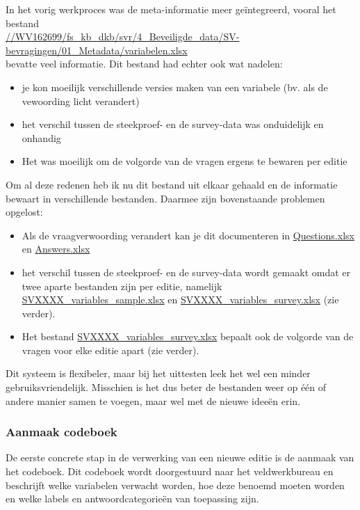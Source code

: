 \documentclass{VSAnote}
\begin{document}
In het vorig werkproces was de meta-informatie meer geïntegreerd, vooral het bestand\\ \url{//WV162699/fs_kb_dkb/svr/4_Beveiligde_data/SV-bevragingen/01_Metadata/variabelen.xlsx}\\
bevatte veel informatie. Dit bestand had echter ook wat nadelen:
\begin{itemize}
\item je kon moeilijk verschillende versies maken van een variabele (bv. als de vewoording licht verandert)
\item het verschil tussen de steekproef- en de survey-data was onduidelijk en onhandig
\item Het was moeilijk om de volgorde van de vragen ergens te bewaren per editie
\end{itemize}
Om al deze redenen heb ik nu dit bestand uit elkaar gehaald en de informatie bewaart in verschillende bestanden. Daarmee zijn bovenstaande problemen opgelost:
\begin{itemize}
\item Als de vraagverwoording verandert kan je dit documenteren in \url{Questions.xlsx} en \url{Answers.xlsx}
\item het verschil tussen de steekproef- en de survey-data wordt gemaakt omdat er twee aparte bestanden zijn per editie, namelijk \url{SVXXXX_variables_sample.xlsx} en \url{SVXXXX_variables_survey.xlsx} (zie verder).
\item Het bestand \url{SVXXXX_variables_survey.xlsx} bepaalt ook de volgorde van de vragen voor elke editie apart (zie verder).
\end{itemize}
Dit systeem is flexibeler, maar bij het uittesten leek het wel een minder gebruiksvriendelijk. Misschien is het dus beter de bestanden weer op één of andere manier samen te voegen, maar wel met de nieuwe ideeën erin.
 












\subsubsection{Aanmaak codeboek}
\label{sec:codebook}

De eerste concrete stap in de verwerking van een nieuwe editie is de aanmaak van het codeboek. Dit codeboek wordt doorgestuurd naar het veldwerkbureau en beschrijft welke variabelen verwacht worden, hoe deze benoemd moeten worden en welke labels en antwoordcategorieën van toepassing zijn.
\end{document}
